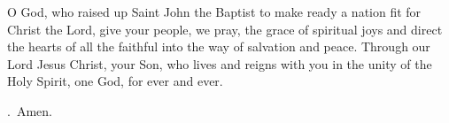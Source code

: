 \lettrine[lines=3]{O}{} God, who raised up Saint John the Baptist
to make ready a nation fit for Christ the Lord,
give your people, we pray,
the grace of spiritual joys
and direct the hearts of all the faithful
into the way of salvation and peace.
Through our Lord Jesus Christ, your Son,
who lives and reigns with you in the unity of the Holy Spirit,
one God, for ever and ever. \par \Rbar.~Amen.
